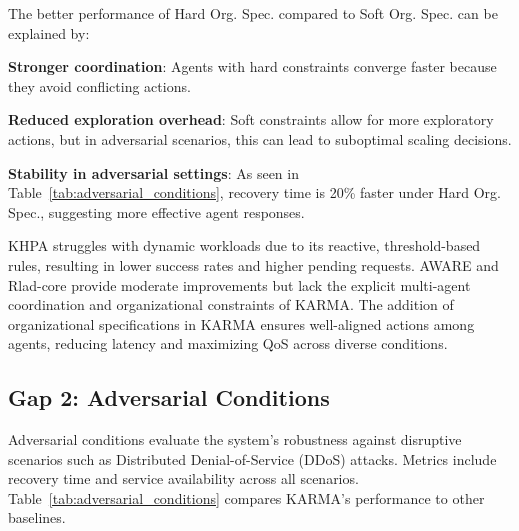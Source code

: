 \documentclass[conference]{IEEEtran}
\begin{document}
The better performance of Hard Org. Spec. compared to Soft Org. Spec. can be explained by:
\begin{enumerate*}[label=\textbf{\arabic*)}, itemjoin={;\quad }]
    \item \textbf{Stronger coordination}: Agents with hard constraints converge faster because they avoid conflicting actions.
    \item \textbf{Reduced exploration overhead}: Soft constraints allow for more exploratory actions, but in adversarial scenarios, this can lead to suboptimal scaling decisions.
    \item \textbf{Stability in adversarial settings}: As seen in Table~\ref{tab:adversarial_conditions}, recovery time is 20\% faster under Hard Org. Spec., suggesting more effective agent responses.
\end{enumerate*}

KHPA struggles with dynamic workloads due to its reactive, threshold-based rules, resulting in lower success rates and higher pending requests. AWARE and Rlad-core provide moderate improvements but lack the explicit multi-agent coordination and organizational constraints of KARMA. The addition of organizational specifications in KARMA ensures well-aligned actions among agents, reducing latency and maximizing QoS across diverse conditions.

\subsection{Gap 2: Adversarial Conditions}
Adversarial conditions evaluate the system's robustness against disruptive scenarios such as Distributed Denial-of-Service (DDoS) attacks. Metrics include recovery time and service availability across all scenarios. Table~\ref{tab:adversarial_conditions} compares KARMA's performance to other baselines.
\end{document}
